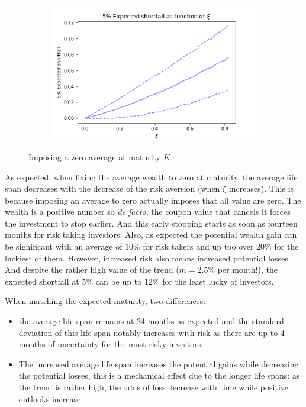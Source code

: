 \documentclass{article}
\begin{document}
\begin{figure}[b!]
\begin{subfigure}[b]{\textwidth}
         \includegraphics[scale=.7]{png/expected_shortfall_non_fixed_W0=1_r=0.0004166666666666667_m=0.02592451988463669_sigma=0.06164058158266796_K=24_S=100000.png}
         \caption{}
         \label{fig:average-final-wealth-zero-expected-shortfall}
     \end{subfigure}
        \caption{Imposing a zero average at maturity $K$}
        \label{fig:variable-maturity}
\end{figure}

As expected, when fixing the average wealth to zero at maturity, the average life span decreases with the decrease of the risk aversion (when $\xi$ increases). This is because imposing an average to zero actually imposes that all value are zero. The wealth is a positive number so \textit{de facto}, the coupon value that cancels it forces the investment to stop earlier. And this early stopping starts as soon as fourteen months for risk taking investors. Also, as expected the potential wealth gain can be significant with an average of $10\%$ for risk takers and up too over $20\%$ for the luckiest of them. However, increased risk also means increased potential losses. And despite the rather high value of the trend ($m = 2.5\%$ per month!), the expected shortfall at $5\%$ can be up to $12\%$ for the least lucky of investors.

When matching the expected maturity, two differences:
\begin{itemize}
\item the average life span remains at 24 months  as expected and the standard deviation of this life span notably increases with risk as there are up to 4 months of uncertainty for the most risky investors. 
\item The increased average life span increases the potential gains while decreasing the potential losses, this is a mechanical effect due to the longer life spans: as the trend is rather high, the odds of loss decrease with time while positive outlooks increase.
\end{itemize}
\end{document}
